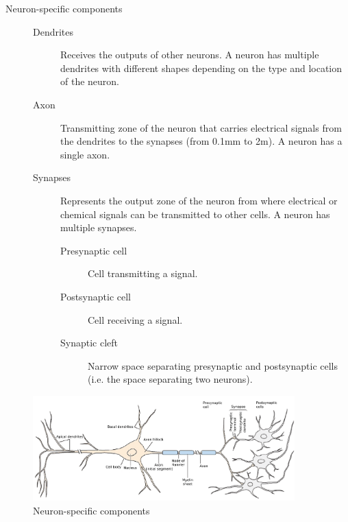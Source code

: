 \begin{description}
    \item[Neuron-specific components] \phantom{}
        \begin{description}
            \item[Dendrites] 
                Receives the outputs of other neurons.
                A neuron has multiple dendrites with different shapes depending on the type and location of the neuron.
            \item[Axon] 
                Transmitting zone of the neuron that carries electrical signals from the dendrites to the synapses (from 0.1mm to 2m).
                A neuron has a single axon.
            \item[Synapses] 
                Represents the output zone of the neuron from where electrical or chemical signals can be transmitted to other cells.
                A neuron has multiple synapses.

                \begin{description}
                    \item[Presynaptic cell] Cell transmitting a signal.
                    \item[Postsynaptic cell] Cell receiving a signal.
                    \item[Synaptic cleft] Narrow space separating presynaptic and postsynaptic cells (i.e. the space separating two neurons).
                \end{description}
        \end{description}
\end{description}

\begin{figure}[H]
    \centering
    \includegraphics[width=0.9\textwidth]{img/neuron_specific.png}
    \caption{Neuron-specific components}
\end{figure}

